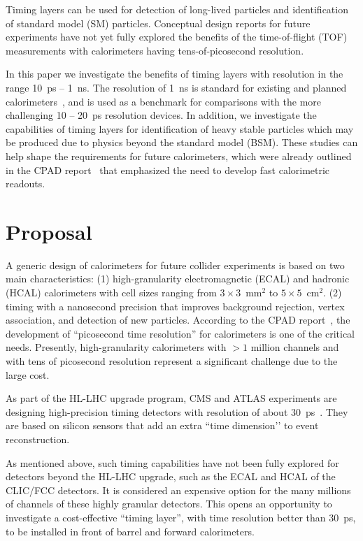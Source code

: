 \documentclass[final,1p,11pt]{elsarticle}
\begin{document}
Timing layers can be used for detection of long-lived particles and identification of standard model (SM) particles. 
Conceptual design reports for future experiments have not yet fully explored 
the benefits of the time-of-flight (TOF) measurements with calorimeters having tens-of-picosecond resolution.

In this paper we investigate the benefits of timing layers with resolution in the range 10~ps -- 1~ns. 
The resolution of 1~ns is standard for existing and planned calorimeters~\cite{Linssen:1425915,Behnke:2013xla,Benedikt:2206376,Tang:2015qga}, and is used as a benchmark for comparisons with the more challenging 10 -- 20~ps  resolution devices. 
In addition, we investigate the capabilities of timing layers for identification of heavy stable particles which may be produced due to 
 physics beyond the 
standard model (BSM). These studies can help shape the requirements for future calorimeters, which were already 
outlined in the CPAD report~\cite{Ahmed:2019sim} that emphasized the need to develop fast calorimetric readouts.
  
\section{Proposal}


A generic design of calorimeters for future collider experiments 
is based on two main characteristics: (1) high-granularity  electromagnetic (ECAL) and hadronic (HCAL) 
calorimeters with cell sizes ranging from $3\times 3$~mm$^2$ to $5\times 5$~cm$^2$.
(2) timing with a nanosecond precision that improves background rejection, vertex association, and detection of new particles. 
According to the CPAD report~\cite{Ahmed:2019sim}, the development of ``picosecond time resolution'' for calorimeters is one 
 of the critical needs. 
Presently,  high-granularity calorimeters with $>1$ million channels and with tens of picosecond resolution represent a 
significant challenge due to the large cost.

As part of the HL-LHC upgrade program, CMS and ATLAS experiments are designing high-precision timing detectors with 
 resolution of about 30~ps~\cite{Collaboration:2623663,FERRI2020162159}. They are based on silicon sensors that add an 
 extra ``time dimension’’ to event reconstruction. 

As mentioned above, such timing capabilities have not been fully explored for detectors beyond the HL-LHC upgrade, such as 
 the ECAL and HCAL of the CLIC/FCC detectors. 
It is considered an expensive option for the many millions of channels of these highly granular detectors. 
This opens an opportunity to investigate a cost-effective ``timing layer'', with time resolution better than 30~ps,  
 to be installed in front of barrel and forward calorimeters.
\end{document}
